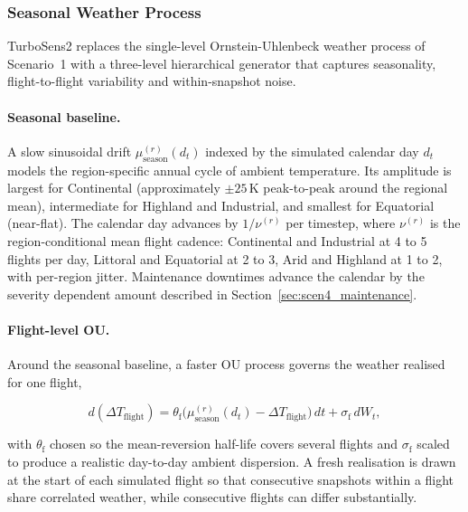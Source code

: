 \subsubsection{Seasonal Weather Process}
\label{sec:scen4_weather}

TurboSens2 replaces the single-level Ornstein-Uhlenbeck weather process
of Scenario~1 with a three-level hierarchical generator that captures
seasonality, flight-to-flight variability and within-snapshot noise.

\paragraph{Seasonal baseline.}
A slow sinusoidal drift $\mu^{(r)}_\mathrm{season}(d_t)$ indexed by the
simulated calendar day $d_t$ models the region-specific annual cycle
of ambient temperature. Its amplitude is largest for Continental
(approximately $\pm 25$\,K peak-to-peak around the regional mean),
intermediate for Highland and Industrial, and smallest for Equatorial
(near-flat). The calendar day advances by $1 / \nu^{(r)}$ per timestep,
where $\nu^{(r)}$ is the region-conditional mean flight cadence:
Continental and Industrial at 4 to 5 flights per day, Littoral and
Equatorial at 2 to 3, Arid and Highland at 1 to 2, with per-region
jitter. Maintenance downtimes advance the calendar by the severity
dependent amount described in Section~\ref{sec:scen4_maintenance}.

\paragraph{Flight-level OU.}
Around the seasonal baseline, a faster OU process governs the weather
realised for one flight,

\begin{equation}
  d(\Delta T_\mathrm{flight})
    = \theta_\mathrm{f}\bigl(\mu^{(r)}_\mathrm{season}(d_t)
      - \Delta T_\mathrm{flight}\bigr)\, dt
      + \sigma_\mathrm{f}\, dW_t,
\end{equation}

with $\theta_\mathrm{f}$ chosen so the mean-reversion half-life covers
several flights and $\sigma_\mathrm{f}$ scaled to produce a realistic
day-to-day ambient dispersion. A fresh realisation is drawn at the
start of each simulated flight so that consecutive snapshots within a
flight share correlated weather, while consecutive flights can differ
substantially.

